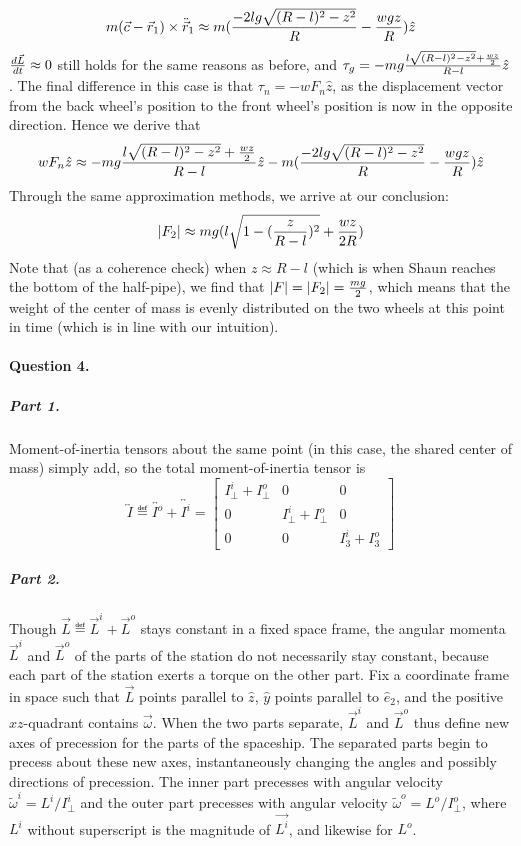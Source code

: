 $$m(\vec c-\vec r_1)\times \ddot{\vec r}_1\approx m(\frac{-2lg\sqrt{(R-l)^2-z^2}}{R}-\frac {wgz}R)\hat z$$
$\frac{d\vec L}{dt}\approx 0$ still holds for the same reasons as before, and $\tau_g=-mg\frac{l\sqrt{(R-l)^2-z^2}+\frac {wz}2}{R-l} \hat z$.  The final difference in this case is that $\tau_n=-wF_n \hat z$, as the displacement vector from the back wheel's position to the front wheel's position is now in the opposite direction.  Hence we derive that
$$w F_n \hat z\approx -mg\frac{l\sqrt{(R-l)^2-z^2}+\frac {wz}2}{R-l} \hat z-m(\frac{-2lg\sqrt{(R-l)^2-z^2}}{R}-\frac {wgz}R)\hat z$$
Through the same approximation methods, we arrive at our conclusion:
$$|F_2|\approx mg(l\sqrt{1-(\frac z {R-l})^2}+\frac{wz}{2R})$$
Note that (as a coherence check) when $z\approx R-l$ (which is when Shaun reaches the bottom of the half-pipe), we find that $|F|=|F_2|=\frac {mg}2$, which means that the weight of the center of mass is evenly distributed on the two wheels at this point in time (which is in line with our intuition).  

\paragraph{Question 4.}

\subparagraph{Part 1.}  Moment-of-inertia tensors about the same point (in this case, the shared center of mass) simply add, so the total moment-of-inertia tensor is $$\overleftrightarrow{I}
\eqdef \overleftrightarrow{I^o} + \overleftrightarrow{I^i} =
\begin{bmatrix}
I_\bot^i + I_\bot^o & 0 & 0 \\
0 & I_\bot^i + I_\bot^o & 0 \\
0 & 0 & I_3^i + I_3^o
\end{bmatrix}$$

\subparagraph{Part 2.}

Though $\vec{L} \eqdef \vec{L}^i + \vec{L}^o$ stays constant in a fixed space frame, the angular momenta $\vec{L}^i$ and $\vec{L}^o$ of the parts of the station do not necessarily stay constant, because each part of the station exerts a torque on the other part.  Fix a coordinate frame in space such that $\vec{L}$ points parallel to $\hat{z}$, $\hat{y}$ points parallel to $\hat{e}_2$, and the positive $xz$-quadrant contains $\vec{\omega}$. When the two parts separate, $\vec{L}^i$ and $\vec{L}^o$ thus define new axes of precession for the parts of the spaceship.  The separated parts begin to precess about these new axes, instantaneously changing the angles and possibly directions of precession.  The inner part precesses with angular velocity $\tilde{\omega}^i = L^i/I_\bot^i$ and the outer part precesses with angular velocity $\tilde{\omega}^o = L^o/I_{\bot}^o$, where $L^i$ without superscript is the magnitude of $\vec{L^i}$, and likewise for $L^o$.

